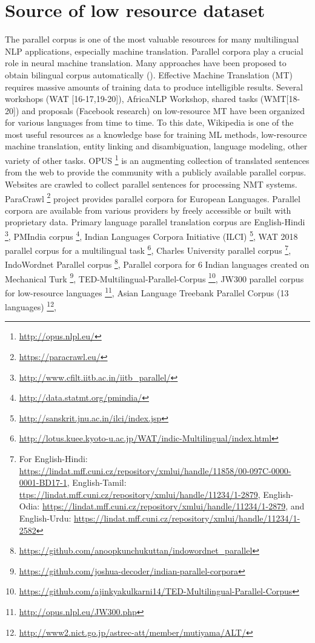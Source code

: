 \documentclass[manuscript,screen]{acmart}
\begin{document}
\section{Source of low resource dataset}
\label{data}
The parallel corpus is one of the most valuable resources for many multilingual NLP applications, especially machine translation. Parallel corpora play a crucial role in neural machine translation. Many approaches have been proposed to obtain bilingual corpus automatically (\citet{zhu2019novel}). Effective Machine Translation (MT) requires massive amounts of training data to produce intelligible results. Several workshops (WAT [16-17,19-20]), AfricaNLP Workshop, shared tasks (WMT[18-20]) and proposals (Facebook research) on low-resource MT have been organized for various languages from time to time. To this date, Wikipedia is one of the most useful resources as a knowledge base for training ML methods, low-resource machine translation, entity linking and disambiguation, language modeling, other variety of other tasks. OPUS \footnote{\url{http://opus.nlpl.eu/}} is an augmenting collection of translated sentences from the web to provide the community with a publicly available parallel corpus. Websites are crawled to collect parallel sentences for processing NMT systems. ParaCrawl \footnote{\url{https://paracrawl.eu/}} project provides parallel corpora for European Languages. Parallel corpora are available from various providers by freely accessible or built with proprietary data. Primary language parallel translation corpus are English-Hindi \footnote{\url{http://www.cfilt.iitb.ac.in/iitb\_parallel/}}, PMIndia corpus \footnote{\url{http://data.statmt.org/pmindia/}}, Indian Languages Corpora Initiative (ILCI) \footnote{\url{http://sanskrit.jnu.ac.in/ilci/index.jsp}}, WAT 2018 parallel corpus for a multilingual task \footnote{\url{ http://lotus.kuee.kyoto-u.ac.jp/WAT/indic-Multilingual/index.html}}, 
Charles University parallel corpus \footnote{For English-Hindi: \url{ https://lindat.mff.cuni.cz/repository/xmlui/handle/11858/00-097C-0000-0001-BD17-1}, English-Tamil: \url{ttps://lindat.mff.cuni.cz/repository/xmlui/handle/11234/1-2879}, English-Odia:  \url{https://lindat.mff.cuni.cz/repository/xmlui/handle/11234/1-2879}, and English-Urdu:  \url{https://lindat.mff.cuni.cz/repository/xmlui/handle/11234/1-2582}}, IndoWordnet Parallel corpus \footnote{\url{https://github.com/anoopkunchukuttan/indowordnet_parallel}}, Parallel corpora for 6 Indian languages created on Mechanical Turk \footnote{\url{https://github.com/joshua-decoder/indian-parallel-corpora}}, TED-Multilingual-Parallel-Corpus \footnote{\url{https://github.com/ajinkyakulkarni14/TED-Multilingual-Parallel-Corpus}}, JW300 parallel corpus for low-resource languages \footnote{\url{http://opus.nlpl.eu/JW300.php}}, Asian Language Treebank Parallel Corpus (13 languages) \footnote{\url{http://www2.nict.go.jp/astrec-att/member/mutiyama/ALT/}}, 
\end{document}
